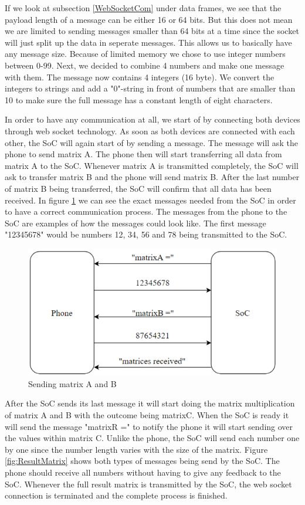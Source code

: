\documentclass[a4paper, 11pt]{report}
\begin{document}
If we look at subsection \ref{WebSocketCom} under data frames, we see that the payload length of a message can be either 16 or 64 bits. But this does not mean we are limited to sending messages smaller than 64 bits at a time since the socket will just split up the data in seperate messages. This allows us to basically have any message size. Because of limited memory we chose to use integer numbers between 0-99. Next, we decided to combine 4 numbers and make one message with them. The message now contains 4 integers (16 byte). We convert the integers to strings and add a "0"-string in front of numbers that are smaller than 10 to make sure the full message has a constant length of eight characters.

In order to have any communication at all, we start of by connecting both devices through web socket technology. As soon as both devices are connected with each other, the SoC will again start of by sending a message. The message will ask the phone to send matrix A. The phone then will start transferring all data from matrix A to the SoC. Whenever matrix A is transmitted completely, the SoC will ask to transfer matrix B and the phone will send matrix B. After the last number of matrix B being transferred, the SoC will confirm that all data has been received. In figure \ref{fig:Matrices} we can see the exact messages needed from the SoC in order to have a correct communication process. The messages from the phone to the SoC are examples of how the messages could look like. The first message "12345678" would be numbers 12, 34, 56 and 78 being transmitted to the SoC.

\begin{figure}[ht]
\centering
\includegraphics[scale=0.7]{images/webSocketCom.pdf}
\caption{Sending matrix A and B}\label{fig:Matrices}
\end{figure}

After the SoC sends its last message it will start doing the matrix multiplication of matrix A and B with the outcome being matrixC. When the SoC is ready it will send the message "matrixR =" to notify the phone it will start sending over the values within matrix C. Unlike the phone, the SoC will send each number one by one since the number length varies with the size of the matrix. Figure \ref{fig:ResultMatrix} shows both types of messages being send by the SoC. The phone should receive all numbers without having to give any feedback to the SoC. Whenever the full result matrix is transmitted by the SoC, the web socket connection is terminated and the complete process is finished.
\end{document}
